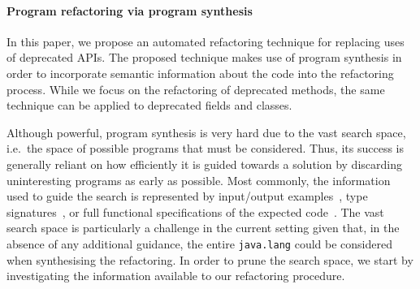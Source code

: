 \documentclass[sigconf,review,anonymous]{acmart}
\begin{document}
%

\paragraph{Program refactoring via program synthesis} In this paper, we propose an
automated refactoring technique for replacing uses of deprecated APIs. 
The proposed technique makes use of program synthesis in order to
incorporate semantic information about the
code into the refactoring process.
While we focus on the refactoring of deprecated methods, the same
technique can be applied to deprecated fields and classes.


Although powerful, program synthesis is very hard due to the vast search space, i.e.~the space of possible programs that must be considered. Thus, its success is generally reliant on how efficiently it is guided towards a solution by discarding uninteresting programs as early as possible. Most commonly, the information used to guide the search is represented by input/output examples~\cite{DBLP:conf/pldi/FeserCD15}, type signatures~\cite{DBLP:conf/pldi/OseraZ15}, or full functional specifications of the expected code~\cite{DBLP:conf/ijcai/MannaW79}.
%
The vast search space is particularly a challenge in the current setting given that, in the absence of any additional guidance, the entire \texttt{java.lang} could be considered when synthesising the refactoring.
In order to prune the search space, we start by investigating the information available to our refactoring procedure.
\end{document}
